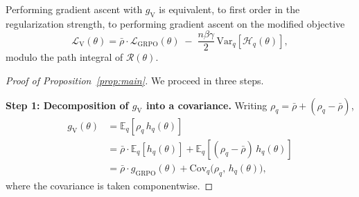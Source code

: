 \documentclass[10pt]{article}
\begin{document}
\begin{corollary}
\label{cor:objective}
Performing gradient ascent with $g_{\text{V}}$ is equivalent, to first order
in the regularization strength, to performing gradient ascent on the modified
objective
\begin{equation}
\mathcal{L}_{\text{V}}(\theta)
= \bar\rho \cdot \mathcal{L}_{\text{GRPO}}(\theta)
\;-\; \frac{n \beta \gamma}{2}\, \mathrm{Var}_q[\mathcal{H}_q(\theta)],
\label{eq:objective}
\end{equation}
modulo the path integral of $\mathcal{R}(\theta)$.
\end{corollary}

\begin{proof}[Proof of Proposition~\ref{prop:main}]
We proceed in three steps.

\medskip
\noindent\textbf{Step 1: Decomposition of $g_{\text{V}}$ into a
covariance.} Writing $\rho_q = \bar\rho + (\rho_q - \bar\rho)$,
\begin{align}
g_{\text{V}}(\theta)
&= \mathbb{E}_q[\rho_q\, h_q(\theta)] \nonumber \\
&= \bar\rho \cdot \mathbb{E}_q[h_q(\theta)] + \mathbb{E}_q[(\rho_q - \bar\rho)\, h_q(\theta)] \nonumber \\
&= \bar\rho \cdot g_{\text{GRPO}}(\theta) + \mathrm{Cov}_q\big(\rho_q,\, h_q(\theta)\big),
\label{eq:proof:cov}
\end{align}
where the covariance is taken componentwise.


\end{proof}
\end{document}
